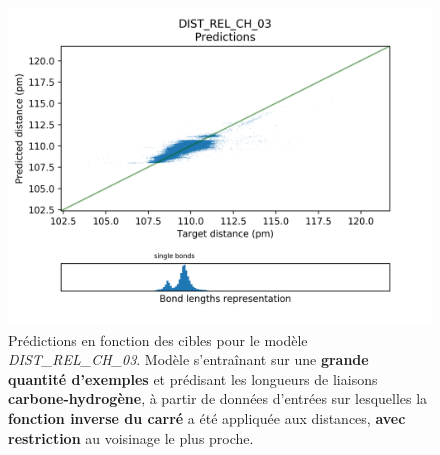 \begin{figure}[!h]
	\centering
	
	\includegraphics[scale=0.75]{../figures/DIST_REL_CH_03/DIST_REL_CH_03_preds_targets.png}	
	
	\caption{Prédictions en fonction des cibles pour le modèle \emph{DIST\_REL\_CH\_03}. Modèle s'entraînant sur une \textbf{grande quantité d'exemples} et prédisant les longueurs de liaisons \textbf{carbone-hydrogène}, à partir de données d'entrées sur lesquelles la \textbf{fonction inverse du carré} a été appliquée aux distances, \textbf{avec restriction} au voisinage le plus proche.}
	
\end{figure}


